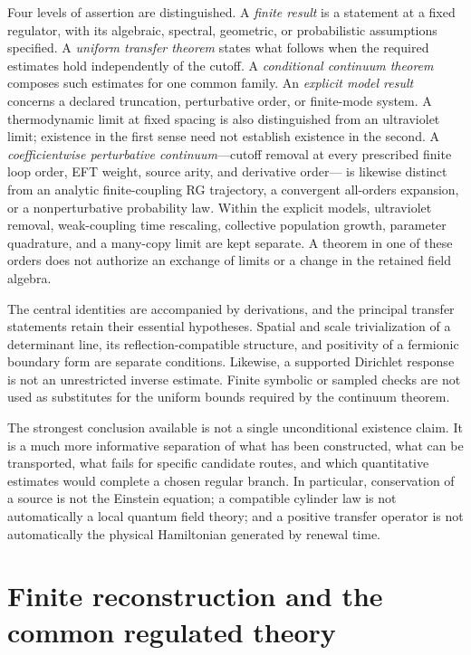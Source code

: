 \documentclass[11pt,a4paper,oneside]{book}
\theoremstyle{plain}
\theoremstyle{definition}
\theoremstyle{remark}
\begin{document}
Four levels of assertion are distinguished.  A \emph{finite result} is a
statement at a fixed regulator, with its algebraic, spectral, geometric, or
probabilistic assumptions specified.  A \emph{uniform transfer theorem}
states what follows when the required estimates hold independently of the
cutoff.  A \emph{conditional continuum theorem} composes such estimates for
one common family.  An \emph{explicit model result} concerns a declared
truncation, perturbative order, or finite-mode system.  A thermodynamic
limit at fixed spacing is also distinguished from an ultraviolet limit;
existence in the first sense need not establish existence in the second.  A
\emph{coefficientwise perturbative continuum}---cutoff removal at every
prescribed finite loop order, EFT weight, source arity, and derivative order---
is likewise distinct from an analytic finite-coupling RG trajectory, a
convergent all-orders expansion, or a nonperturbative probability law.
Within the explicit models, ultraviolet removal, weak-coupling time
rescaling, collective population growth, parameter quadrature, and a
many-copy limit are kept separate.  A theorem in one of these orders
does not authorize an exchange of limits or a change in the retained
field algebra.

The central identities are accompanied by derivations, and the principal
transfer statements retain their essential hypotheses.  Spatial and scale
trivialization of a determinant line, its reflection-compatible structure,
and positivity of a fermionic boundary form are separate conditions.
Likewise, a supported Dirichlet response is not an unrestricted inverse
estimate.  Finite symbolic or sampled checks are not used as substitutes
for the uniform bounds required by the continuum theorem.

The strongest conclusion available is not a single unconditional existence claim. It is a much more informative separation of what has been constructed, what can be transported, what fails for specific candidate routes, and which quantitative estimates would complete a chosen regular branch. In particular, conservation of a source is not the Einstein equation; a compatible cylinder law is not automatically a local quantum field theory; and a positive transfer operator is not automatically the physical Hamiltonian generated by renewal time.

\begingroup
\setlength{\parskip}{0pt}
\linespread{0.97}\selectfont
\tableofcontents
\endgroup
\mainmatter
\part{Finite reconstruction and the common regulated theory}
\end{document}
